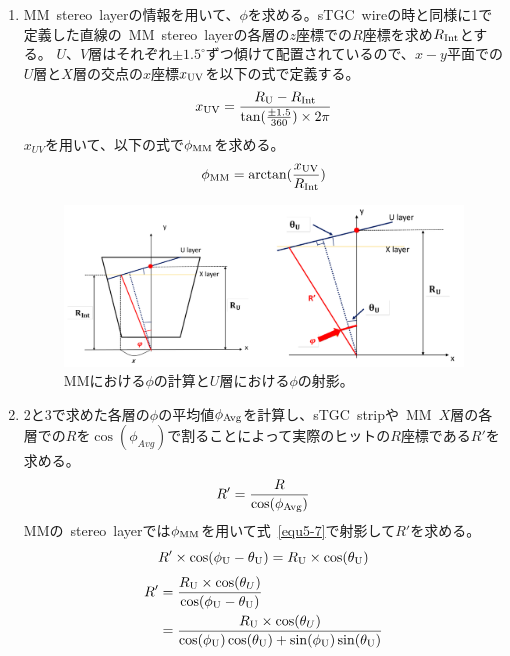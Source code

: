\begin{enumerate}
    \item MM~stereo~layerの情報を用いて、$\phi$を求める。sTGC~wireの時と同様に1で定義した直線の~MM~stereo~layerの各層の$z$座標での$R$座標を求め$R_{\rm{Int}}$とする。
    $U$、$V$層はそれぞれ$\pm1.5^{\circ}$ずつ傾けて配置されているので、$x-y$平面での$U$層と$X$層の交点の$x$座標$x_{\rm{UV}}$を以下の式で定義する。
    \begin{equation}
        x_{\rm{UV}}=\frac{R_{\rm{U}}-R_{\rm{Int}}}{\tan(\frac{\pm1.5}{360}) \times 2\pi}\label{equ5-3}
    \end{equation}
    $x_{UV}$を用いて、以下の式で$\phi_{\rm{MM}}$を求める。
    \begin{equation}
        \phi_{\rm{MM}}=\arctan(\frac{x_{\rm{UV}}}{R_{\rm{Int}}})\label{equ5-4}
    \end{equation}
    \begin{figure}[h]
        \centering
        \includegraphics[clip, width=12cm]{fig/5/mm_phi.png}
        \caption{MMにおける$\phi$の計算と$U$層における$\phi$の射影\cite{article:noguchi}。}
        \label{fig:5-3}
    \end{figure}
    \item 2と3で求めた各層の$\phi$の平均値$\phi_{\rm{Avg}}$を計算し、sTGC~stripや~MM~$X$層の各層での$R$を$\cos(\phi_{Avg})$で割ることによって実際のヒットの$R$座標である$R'$を求める。
    \begin{equation}
        R'=\frac{R}{\cos(\phi_{\rm{Avg}})}\label{equ5-5}
    \end{equation}
    MMの~stereo~layerでは$\phi_{\rm{MM}}$を用いて式~\eqref{equ5-7}で射影して$R'$を求める。
    \begin{equation}
        R' \times \cos(\phi_{\rm{U}}-\theta_{\rm{U}})=R_{\rm{U}} \times \cos(\theta_{\rm{U}})\label{equ5-6}
    \end{equation}
    \begin{equation}
    \begin{split}
        R' &= \frac{R_{\rm{U}} \times \cos(\theta_{U})}{\cos(\phi_{\rm{U}}-\theta_{\rm{U}})}\\
        &= \frac{R_{\rm{U}} \times \cos(\theta_{U})}{\cos(\phi_{\rm{U}})\cos(\theta_{\rm{U}}) + \sin(\phi_{\rm{U}})\sin(\theta_{\rm{U}})}\label{equ5-7}
    \end{split}
    \end{equation}
\end{enumerate}

